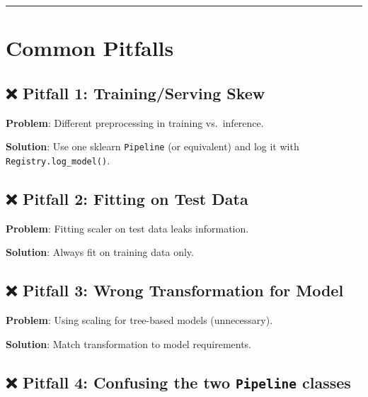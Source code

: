\documentclass[
  letterpaper,
  DIV=11,
  numbers=noendperiod]{scrreprt}
\begin{document}
\begin{center}\rule{0.5\linewidth}{0.5pt}\end{center}

\hypertarget{common-pitfalls-7}{%
\section{Common Pitfalls}\label{common-pitfalls-7}}

\hypertarget{pitfall-1-trainingserving-skew}{%
\subsection{❌ Pitfall 1: Training/Serving
Skew}\label{pitfall-1-trainingserving-skew}}

\textbf{Problem}: Different preprocessing in training vs.~inference.

\textbf{Solution}: Use one sklearn \texttt{Pipeline} (or equivalent) and
log it with \texttt{Registry.log\_model()}.

\hypertarget{pitfall-2-fitting-on-test-data}{%
\subsection{❌ Pitfall 2: Fitting on Test
Data}\label{pitfall-2-fitting-on-test-data}}

\textbf{Problem}: Fitting scaler on test data leaks information.

\textbf{Solution}: Always fit on training data only.

\hypertarget{pitfall-3-wrong-transformation-for-model}{%
\subsection{❌ Pitfall 3: Wrong Transformation for
Model}\label{pitfall-3-wrong-transformation-for-model}}

\textbf{Problem}: Using scaling for tree-based models (unnecessary).

\textbf{Solution}: Match transformation to model requirements.

\hypertarget{pitfall-4-confusing-the-two-pipeline-classes}{%
\subsection{\texorpdfstring{❌ Pitfall 4: Confusing the two
\texttt{Pipeline}
classes}{❌ Pitfall 4: Confusing the two Pipeline classes}}\label{pitfall-4-confusing-the-two-pipeline-classes}}
\end{document}
